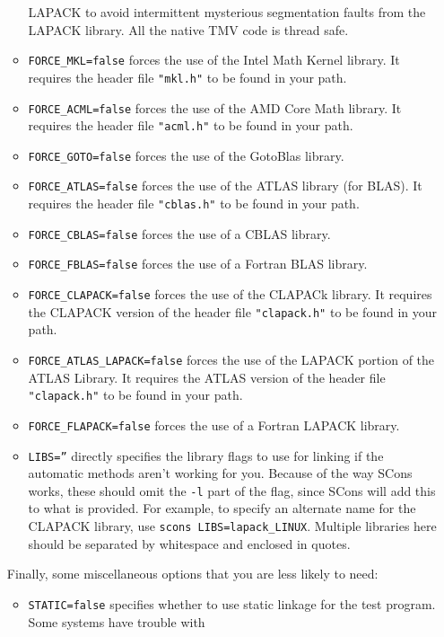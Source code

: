 \documentclass[twoside,letterpaper,11pt]{article}
\begin{document}
\begin{enumerate}
\begin{itemize}
LAPACK to avoid intermittent mysterious segmentation faults from the
LAPACK library.  All the native TMV code is thread safe.
\item \texttt{FORCE\_MKL=false} forces the use of the Intel Math Kernel library. 
It requires the header file \texttt{"mkl.h"} to be found in your path. 
\item \texttt{FORCE\_ACML=false} forces the use of the AMD Core Math library.  
It requires the header file \texttt{"acml.h"} to be found in your path.
\item \texttt{FORCE\_GOTO=false} forces the use of the GotoBlas library.  
\item \texttt{FORCE\_ATLAS=false} forces the use of the ATLAS library (for BLAS).  
It requires the header file \texttt{"cblas.h"} to be found in your path.
\item \texttt{FORCE\_CBLAS=false} forces the use of a CBLAS library.
\item \texttt{FORCE\_FBLAS=false} forces the use of a Fortran BLAS library.
\item \texttt{FORCE\_CLAPACK=false} forces the use of the CLAPACk library. 
It requires the CLAPACK version of the header file \texttt{"clapack.h"} to be found in your path.
\item \texttt{FORCE\_ATLAS\_LAPACK=false} forces the use of the LAPACK portion
of the ATLAS Library.  
It requires the ATLAS version of the header file \texttt{"clapack.h"} to be found in your path.
\item \texttt{FORCE\_FLAPACK=false} forces the use of a Fortran LAPACK library.
\item \texttt{LIBS=''} directly specifies the library flags to use for linking if the automatic methods aren't working for you.  Because of the way SCons works,
these should omit the \texttt{-l} part of the flag, since SCons will add this to what is provided.
For example, to specify an alternate name for the CLAPACK library, use 
\texttt{scons LIBS=lapack\_LINUX}.  Multiple libraries here should be separated by 
whitespace and enclosed in quotes.
\end{itemize}
Finally, some miscellaneous options that you are less likely to need:
\begin{itemize}
\item \texttt{STATIC=false} specifies whether to use static linkage for the test program.  Some systems have trouble with

\end{itemize}
\end{enumerate}
\end{document}
